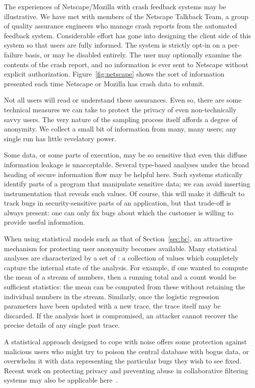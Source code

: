 The experiences of Netscape/Mozilla with crash feedback systems may be
illustrative.  We have met with members of the Netscape Talkback Team,
a group of quality assurance engineers who manage crash reports from
the automated feedback system.  Considerable effort has gone into
designing the client side of this system so that users are fully
informed.  The system is strictly opt-in on a per-failure basis, or
may be disabled entirely.  The user may optionally examine the
contents of the crash report, and no information is ever sent to
Netscape without explicit authorization.  Figure~\ref{fig:netscape}
shows the sort of information presented each time Netscape or Mozilla
has crash data to submit.

Not all users will read or understand these assurances.  Even so,
there are some technical measures we can take to protect the privacy
of even non-technically savvy users.  The very nature of the sampling
process itself affords a degree of anonymity.  We collect a small bit
of information from many, many users; any single run has little
revelatory power.

Some data, or some parts of execution, may be so sensitive that even
this diffuse information leakage is unacceptable.  Several type-based
analyses under the broad heading of secure information flow
\cite{Broadwell:2003:SSGSCI,1997:tapsoft:volpano,ZdZhNyMy2001} may be
helpful here.  Such systems statically identify parts of a program
that manipulate sensitive data; we can avoid inserting instrumentation
that reveals such values.  Of course, this will make it difficult to
track bugs in security-sensitive parts of an application, but that
trade-off is always present: one can only fix bugs about which 
the customer is willing to provide useful information.

When using statistical models such as that of Section~\ref{sec:bc}, an
attractive mechanism for protecting user anonymity becomes available.
Many statistical analyses are characterized by a set of
: a collection of values which
completely capture the internal state of the analysis.  For example,
if one wanted to compute the mean of a stream of numbers, then a
running total and a count would be sufficient statistics: the mean can
be computed from these without retaining the individual numbers in the
stream.  Similarly, once the logistic regression parameters have been
updated with a new trace, the trace itself may be discarded.  If the
analysis host is compromised, an attacker cannot recover the precise
details of any single past trace.

A statistical approach designed to cope with noise offers some
protection against malicious users who might try to poison the central
database with bogus data, or overwhelm it with data representing the
particular bugs they wish to see fixed.  Recent work on protecting
privacy and preventing abuse in collaborative filtering systems may
also be applicable here~\cite{Canny2002,EC00*150}.


